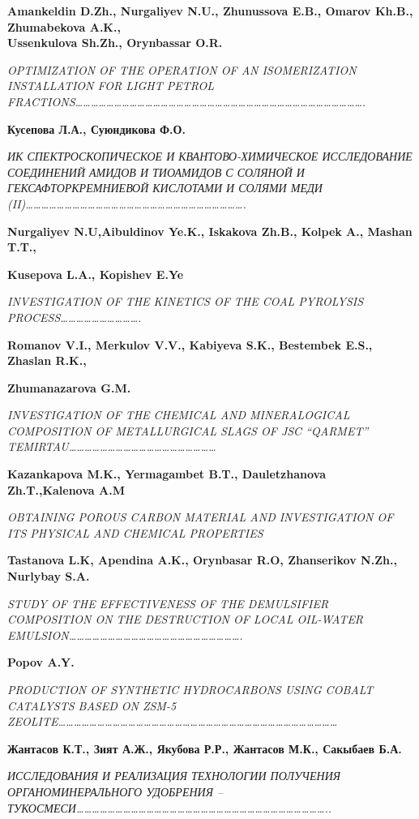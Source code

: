 \textbf{Amankeldin D.Zh., Nurgaliyev N.U., Zhunussova E.B., Omarov
Kh.B., Zhumabekova A.K.,\\
Ussenkulova Sh.Zh., Orynbassar O.R.}

\emph{OPTIMIZATION OF THE OPERATION OF AN ISOMERIZATION INSTALLATION FOR
LIGHT PETROL
FRACTIONS\ldots\ldots\ldots\ldots\ldots\ldots\ldots\ldots\ldots\ldots\ldots\ldots\ldots\ldots\ldots\ldots\ldots\ldots\ldots\ldots\ldots\ldots\ldots\ldots\ldots\ldots\ldots\ldots\ldots\ldots\ldots\ldots\ldots\ldots\ldots\ldots\ldots.}

\textbf{Кусепова Л.А., Суюндикова Ф.О.}

\emph{ИК СПЕКТРОСКОПИЧЕСКОЕ И КВАНТОВО-ХИМИЧЕСКОЕ ИССЛЕДОВАНИЕ
СОЕДИНЕНИЙ АМИДОВ И ТИОАМИДОВ С СОЛЯНОЙ И ГЕКСАФТОРКРЕМНИЕВОЙ КИСЛОТАМИ
И СОЛЯМИ МЕДИ
(II)\ldots\ldots\ldots\ldots\ldots\ldots\ldots\ldots\ldots\ldots\ldots\ldots\ldots\ldots\ldots\ldots\ldots\ldots\ldots\ldots\ldots\ldots\ldots\ldots\ldots\ldots\ldots\ldots.}

\textbf{Nurgaliyev N.U,Aibuldinov Ye.K., Iskakova Zh.B., Kolpek A.,
Mashan T.T.,}

\textbf{Kusepova L.A., Kopishev E.Ye}

\emph{INVESTIGATION OF THE KINETICS OF THE COAL PYROLYSIS
PROCESS\ldots\ldots\ldots\ldots\ldots\ldots\ldots\ldots\ldots\ldots.}

\textbf{Romanov V.I., Merkulov V.V., Kabiyeva S.K., Bestembek E.S.,
Zhaslan R.K.,}

\textbf{Zhumanazarova G.M.}

\emph{INVESTIGATION OF THE CHEMICAL AND MINERALOGICAL COMPOSITION OF
METALLURGICAL SLAGS OF JSC ``QARMET''
TEMIRTAU\ldots\ldots\ldots\ldots\ldots\ldots\ldots\ldots\ldots\ldots\ldots\ldots\ldots\ldots\ldots\ldots\ldots\ldots\ldots{}}

\textbf{Kazankapova M.K., Yermagambet B.T., Dauletzhanova Zh.T.,Kalenova
A.M}

\emph{OBTAINING POROUS CARBON MATERIAL AND INVESTIGATION OF ITS PHYSICAL
AND CHEMICAL PROPERTIES}

\textbf{Tastanova L.K, Apendina A.K., Orynbasar R.O, Zhanserikov N.Zh.,
Nurlybay S.A.}

\emph{STUDY OF THE EFFECTIVENESS OF THE DEMULSIFIER COMPOSITION ON THE
DESTRUCTION OF LOCAL OIL-WATER
EMULSION\ldots\ldots\ldots\ldots\ldots\ldots\ldots\ldots\ldots\ldots\ldots\ldots\ldots\ldots\ldots\ldots\ldots\ldots\ldots\ldots\ldots\ldots.}

\textbf{Popov A.Y.}

\emph{PRODUCTION OF SYNTHETIC HYDROCARBONS USING COBALT CATALYSTS BASED
ON ZSM-5
ZEOLITE\ldots\ldots\ldots\ldots\ldots\ldots\ldots\ldots\ldots\ldots\ldots\ldots\ldots\ldots\ldots\ldots\ldots\ldots\ldots\ldots\ldots\ldots\ldots\ldots\ldots\ldots\ldots\ldots\ldots\ldots\ldots\ldots\ldots\ldots\ldots\ldots{}}

\textbf{Жантасов К.Т., Зият А.Ж., Якубова Р.Р., Жантасов М.К., Сакыбаев
Б.А.}

\emph{ИССЛЕДОВАНИЯ И РЕАЛИЗАЦИЯ ТЕХНОЛОГИИ ПОЛУЧЕНИЯ ОРГАНОМИНЕРАЛЬНОГО
УДОБРЕНИЯ --
ТУКОСМЕСИ\ldots\ldots\ldots\ldots\ldots\ldots\ldots\ldots\ldots\ldots\ldots\ldots\ldots\ldots\ldots\ldots\ldots\ldots\ldots\ldots\ldots\ldots\ldots\ldots\ldots\ldots\ldots\ldots\ldots\ldots\ldots\ldots..}

